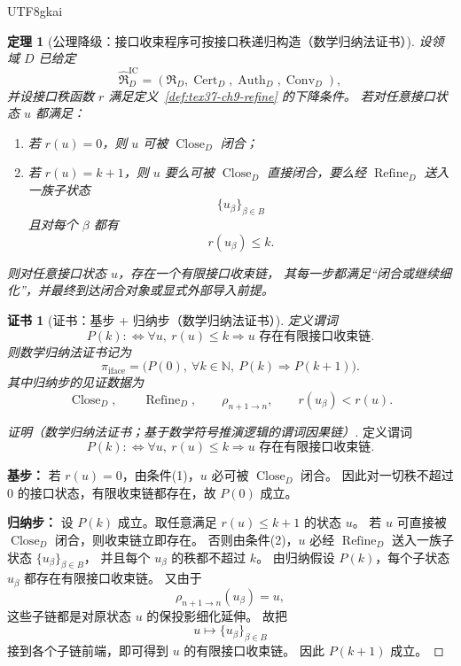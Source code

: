 \documentclass[12pt]{article}
\newtheorem{theorem}{定理}[section]
\newtheorem{Certificate}{证书}[section]
\newcommand{\NN}{\mathbb{N}}
\newcommand{\Cert}{\operatorname{Cert}}
\newcommand{\Auth}{\operatorname{Auth}}
\newcommand{\Conv}{\operatorname{Conv}}
\newcommand{\Refine}{\operatorname{Refine}}
\newcommand{\Close}{\operatorname{Close}}
\begin{document}
\begin{CJK*}{UTF8}{gkai}
\begin{theorem}[公理降级：接口收束程序可按接口秩递归构造（数学归纳法证书）]
\label{thm:tex37-ch9-rank-induction}
设领域 $D$ 已给定
\[
  \widehat{\mathfrak R}_D^{\mathrm{IC}}
  =
  (\mathfrak R_D,\Cert_D,\Auth_D,\Conv_D),
\]
并设接口秩函数 $r$ 满足定义~\ref{def:tex37-ch9-refine} 的下降条件。
若对任意接口状态 $u$ 都满足：
\begin{enumerate}
  \item 若 $r(u)=0$，则 $u$ 可被 $\Close_D$ 闭合；
  \item 若 $r(u)=k+1$，则 $u$ 要么可被 $\Close_D$ 直接闭合，要么经 $\Refine_D$ 送入一族子状态
  \[
    \{u_\beta\}_{\beta\in B}
  \]
  且对每个 $\beta$ 都有
  \[
    r(u_\beta)\le k.
  \]
\end{enumerate}
则对任意接口状态 $u$，存在一个有限接口收束链，
其每一步都满足“闭合或继续细化”，并最终到达闭合对象或显式外部导入前提。
\end{theorem}

\begin{Certificate}[证书：基步 + 归纳步（数学归纳法证书）]
\label{cert:tex37-ch9-rank-induction}
定义谓词
\[
  P(k)
  :
  \Longleftrightarrow
  \forall u,\ r(u)\le k
  \Rightarrow
  \text{$u$ 存在有限接口收束链}.
\]
则数学归纳法证书记为
\[
  \pi_{\mathrm{iface}}
  =
  \bigl(
    P(0),\
    \forall k\in\NN,\ P(k)\Rightarrow P(k+1)
  \bigr).
\]
其中归纳步的见证数据为
\[
  \Close_D,
  \qquad
  \Refine_D,
  \qquad
  \rho_{n+1\to n},
  \qquad
  r(u_\beta)<r(u).
\]
\end{Certificate}

\begin{proof}[证明（数学归纳法证书；基于数学符号推演逻辑的谓词因果链）]
定义谓词
\[
  P(k)
  :
  \Longleftrightarrow
  \forall u,\ r(u)\le k
  \Rightarrow
  \text{$u$ 存在有限接口收束链}.
\]

\textbf{基步：}
若 $r(u)=0$，由条件(1)，$u$ 必可被 $\Close_D$ 闭合。
因此对一切秩不超过 $0$ 的接口状态，有限收束链都存在，故 $P(0)$ 成立。

\textbf{归纳步：}
设 $P(k)$ 成立。取任意满足 $r(u)\le k+1$ 的状态 $u$。
若 $u$ 可直接被 $\Close_D$ 闭合，则收束链立即存在。
否则由条件(2)，$u$ 必经 $\Refine_D$ 送入一族子状态 $\{u_\beta\}_{\beta\in B}$，
并且每个 $u_\beta$ 的秩都不超过 $k$。
由归纳假设 $P(k)$，每个子状态 $u_\beta$ 都存在有限接口收束链。
又由于
\[
  \rho_{n+1\to n}(u_\beta)=u,
\]
这些子链都是对原状态 $u$ 的保投影细化延伸。
故把
\[
  u\longmapsto \{u_\beta\}_{\beta\in B}
\]
接到各个子链前端，即可得到 $u$ 的有限接口收束链。
因此 $P(k+1)$ 成立。


\end{proof}
\end{CJK*}
\end{document}
